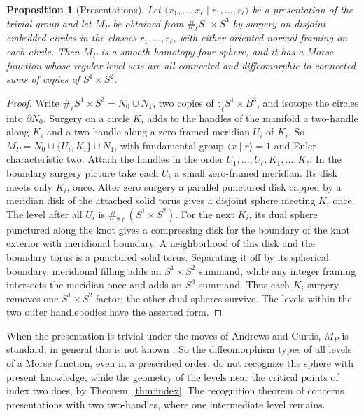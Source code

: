 \documentclass[11pt,letterpaper]{article}
\numberwithin{equation}{section}
\newtheorem{proposition}[theorem]{Proposition}
\theoremstyle{definition}
\begin{document}
\begin{proposition}[Presentations]\label{prop:presentation}
Let \(\langle x_1,\dots,x_\ell\mid r_1,\dots,r_\ell\rangle\) be a
presentation of the trivial group and let \(M_P\) be obtained from
\(\#_\ell S^1\times S^3\) by surgery on disjoint embedded circles in the
classes \(r_1,\dots,r_\ell\), with either oriented normal framing
on each circle. Then \(M_P\) is a smooth homotopy
four-sphere, and it has a Morse function whose regular level sets are all
connected and diffeomorphic to connected sums of copies of
\(S^1\times S^2\).
\end{proposition}
\begin{proof}
Write \(\#_\ell S^1\times S^3=N_0\cup N_1\), two copies of
\(\natural_\ell S^1\times B^3\), and isotope the circles into
\(\partial N_0\). Surgery on a circle \(K_i\) adds to the handles of the
manifold a two-handle along \(K_i\) and a two-handle along a zero-framed
meridian \(U_i\) of \(K_i\). So \(M_P=N_0\cup\{U_i,K_i\}\cup N_1\), with
fundamental group \(\langle x\mid r\rangle=1\) and Euler characteristic
two. Attach the handles in the order \(U_1,\dots,U_\ell,K_1,\dots,K_\ell\).
In the
boundary surgery picture take each \(U_i\) a small zero-framed meridian.
Its disk meets only \(K_i\), once. After zero surgery a parallel
punctured disk capped by a meridian disk of the attached solid torus
gives a disjoint sphere meeting \(K_i\) once. The level after all
\(U_i\) is \(\#_{2\ell}(S^1\times S^2)\). For the next \(K_i\), its
dual sphere punctured along the knot gives a compressing disk for the
boundary of the knot exterior with meridional boundary. A neighborhood
of this disk and the boundary torus is a punctured solid torus.
Separating it off by its spherical boundary, meridional filling adds an
\(S^1\times S^2\) summand, while any integer framing intersects the
meridian once and adds an \(S^3\) summand. Thus each \(K_i\)-surgery
removes one \(S^1\times S^2\) factor; the other dual spheres survive.
The levels within the two outer handlebodies have the asserted form.
\end{proof}

When the presentation is trivial under the moves of Andrews and Curtis,
\(M_P\) is standard; in general this is not known
\cite{GompfScharlemannThompson2010}. So the diffeomorphism types of all
levels of a Morse function, even in a prescribed order, do not recognize
the sphere with present knowledge, while the geometry of the levels near
the critical points of index two does, by Theorem~\ref{thm:index}. The
recognition theorem of \cite{Baker2026HandleCuts} concerns presentations
with two two-handles, where one intermediate level remains.
\end{document}
